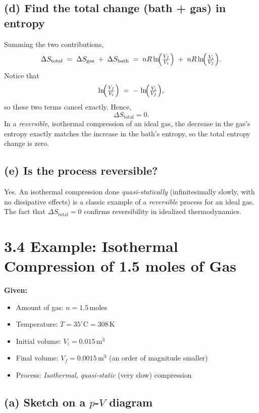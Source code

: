 \documentclass[12pt]{article}
\theoremstyle{definition} %
\theoremstyle{plain} %
\begin{document}
\subsection*{(d) Find the total change (bath + gas) in entropy}

Summing the two contributions,
\[
\Delta S_{\text{total}} 
\;=\;
\Delta S_{\text{gas}}
\;+\;
\Delta S_{\text{bath}}
\;=\;
nR \ln\!\Bigl(\tfrac{V_f}{V_i}\Bigr)
\;+\;
nR \ln\!\Bigl(\tfrac{V_i}{V_f}\Bigr).
\]
Notice that
\[
\ln\!\Bigl(\tfrac{V_f}{V_i}\Bigr)
\;=\;
-\,\ln\!\Bigl(\tfrac{V_i}{V_f}\Bigr),
\]
so these two terms cancel exactly. 
Hence,
\[
\boxed{\Delta S_{\text{total}} = 0.}
\]
In a \emph{reversible}, isothermal compression of an ideal gas, the decrease in the gas's entropy exactly matches the increase in the bath's entropy, so the total entropy change is zero.

\subsection*{(e) Is the process reversible?}

Yes. 
An isothermal compression done \emph{quasi-statically} (infinitesimally slowly, with no dissipative effects) is a classic example of a \emph{reversible} process for an ideal gas. 
The fact that $\Delta S_{\text{total}}=0$ confirms reversibility in idealized thermodynamics.

\section*{3.4 Example: Isothermal Compression of 1.5 moles of Gas}

\noindent
\textbf{Given:}
\begin{itemize}
  \item Amount of gas: $n=1.5\,\text{moles}$
  \item Temperature: $T=35^\circ\mathrm{C}=308\,\mathrm{K}$
  \item Initial volume: $V_i=0.015\,\mathrm{m^3}$
  \item Final volume: $V_f=0.0015\,\mathrm{m^3}$ (an order of magnitude smaller)
  \item Process: \emph{Isothermal}, \emph{quasi‐static} (very slow) compression
\end{itemize}

\subsection*{(a) Sketch on a $p$-$V$ diagram}
\end{document}
